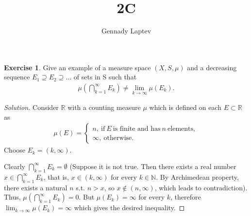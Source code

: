 \documentclass[letterpaper, 12pt, english]{article}
\title{2C}
\author{Gennady Laptev}
\date{}
\theoremstyle{definition}
\theoremstyle{definition}
\newtheorem{problem}{Exercise}
\theoremstyle{definition}
\newenvironment{sol}{\begin{proof}[Solution]}{\end{proof}}
\theoremstyle{plain} %
\theoremstyle{plain} %
\theoremstyle{plain} %
\theoremstyle{plain} %
\theoremstyle{remark}
\begin{document}
\maketitle
\setcounter{section}{0}


\setcounter{problem}{9}
\begin{problem}
Give an example of a measure space $ (X, S, \mu ) $ and a decreasing sequence
$ E_{1} \supseteq E_{2} \supseteq \ldots $ of sets in S such that 
\begin{gather*}
    \mu \left( \bigcap_{k=1}^{ \infty} E_{k} \right) \ne \lim_{k \to \infty} \mu(E_{k}).
\end{gather*}
\begin{sol}
   Consider $ \mathbb{R} $ with a counting measure $ \mu $ which is
   defined on each $ E \subset \mathbb{R} $ as
   \begin{gather*}
       \mu(E) = 
      \begin{cases}
          n, ~\textrm{if}~ E ~\textrm{is finite and has}~n ~\textrm{elements}, \\ 
          \infty, ~\textrm{otherwise}.
      \end{cases}
   \end{gather*}
   Choose $ E_k = (k, \infty)$.

   Clearly $ \bigcap_{k=1}^{ \infty} E_{k} = \emptyset $ (Suppose it is not true.
   Then there exists a real number $ x \in \bigcap_{k=1}^{ \infty} E_{k} $,
   that is, $ x \in (k, \infty) $ for every $ k \in \mathbb{N} $.
   By Archimedean property, there exists a natural $ n $ s.t. $ n > x $, 
   so $ x \not \in (n, \infty) $, which leads to contradiction). Thus, 
   $ \mu \left( \bigcap_{k=1}^{ \infty} E_{k} \right) = 0 $. 
   But $ \mu(E_k) = \infty $ for every $ k $, therefore
   $ \lim_{k \to \infty} \mu(E_{k}) = \infty $  which gives the desired inequality.
\end{sol}
\end{problem}


 
\end{document}
